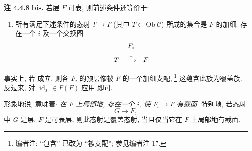 \medskip
\noindent{}\textbf{注 4.4.8 bis.}
若层 \(F\) 可表, 则前述条件还等价于:
\begin{enumerate}
  \item[(viii)]
    所有满足下述条件的态射 \(T\to F\) (其中
    \(T\in\operatorname{Ob}\mathscr C\)) 所成的集合是 \(F\) 的加细:
    存在一个 \(i\) 及一个交换图
    \[
    \begin{array}{ccc}
       &F_i&\\[-0.4ex]
       &\big\downarrow&\\[-0.4ex]
      T&\longrightarrow&F
    \end{array}
    \]
\end{enumerate}

事实上, 若  成立,
则各 \(F_i\) 的预层像被 \(F\) 的一个加细支配,
\footnote{编者注: \textquotedblleft 包含\textquotedblright{}
已改为 \textquotedblleft 被支配\textquotedblright; 参见编者注 17.}
这蕴含此族为覆盖族. 反过来, 对 \(\operatorname{id}_F\in F(F)\)
应用  即可.

形象地说, 意味着:
\textit{在 \(F\) 上局部地, 存在一个 \(i\), 使 \(F_i\to F\) 有截面}.
特别地, 若态射
\[
  G\longrightarrow F,
\]
中 \(G\) 是层, \(F\) 是可表层, 则此态射是覆盖态射,
当且仅当它在 \(F\) 上局部地有截面.

